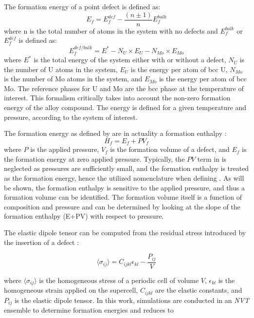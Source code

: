 \documentclass[review]{elsarticle}
\begin{document}
The formation energy of a point defect is defined as:
\begin{equation}\label{eq:eform1}
 E_f = E_f^{def} - \frac{(n\pm1)}{n}E_f^{bulk}
\end{equation}
\noindent where n is the total number of atoms in the system with no defects and $E_f^{bulk}$ or $E_f^{def}$ is defined as:
\begin{equation}\label{eq:eform2}
E_f^{def/bulk} = E^* - N_U \times E_U - N_{Mo} \times E_{Mo}
\end{equation}
\noindent where $E^*$ is the total energy of the system either with or without a defect, $N_U$ is the number of U atoms in the system, $E_U$ is the energy per atom of bcc U, $N_{Mo}$ is the number of Mo atoms in the system, and $E_{Mo}$ is the energy per atom of bcc Mo. The reference phases for U and Mo are the bcc phase at the temperature of interest. This formalism critically takes into account the non-zero formation energy of the alloy compound. The energy is defined for a given temperature and pressure, according to the system of interest. 

The formation energy as defined by  are in actuality a formation enthalpy \cite{kraftmakher1998}:
\begin{equation}\label{eq:enthalpy}
 H_f = E_f + PV_f 
\end{equation}
\noindent where $P$ is the applied pressure, $V_f$ is the formation volume of a defect, and $E_f$ is the formation energy at zero applied pressure. Typically, the $PV$ term in  is neglected as pressures are sufficiently small, and the formation enthalpy is treated as the formation energy, hence the utilized nomenclature when defining . As will be shown, the formation enthalpy is sensitive to the applied pressure, and thus a formation volume can be identified. The formation volume itself is a function of composition and pressure and can be determined by looking at the slope of the formation enthalpy (E+PV) with respect to pressure. 

The elastic dipole tensor can be computed from the residual stress introduced by the insertion of a defect \cite{varvenne2017}:

\begin{equation}\label{eq:dipole1}
    \langle \sigma_{ij} \rangle = C_{ijkl}\epsilon_{kl} - \frac{P_{ij}}{V}
\end{equation}

\noindent where $\langle \sigma_{ij} \rangle$ is the homogeneous stress of a periodic cell of volume $V$, $\epsilon_{kl}$ is the homogeneous strain applied on the supercell, $C_{ijkl}$ are the elastic constants, and $P_{ij}$ is the elastic dipole tensor. In this work, simulations are conducted in an \textit{NVT} ensemble to determine formation energies and  reduces to 
\end{document}

